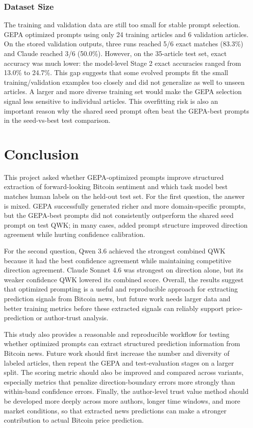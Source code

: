 \documentclass[sigconf,screen]{acmart}
\begin{document}
\subsubsection{Dataset Size}

The training and validation data are still too small for stable prompt
selection. GEPA optimized prompts using only 24 training articles and 6
validation articles. On the stored validation outputs, three runs reached
5/6 exact matches (83.3\%) and Claude reached 3/6 (50.0\%). However, on the
35-article test set, exact accuracy was much lower: the model-level Stage 2
exact accuracies ranged from 13.0\% to 24.7\%. This gap suggests that some
evolved prompts fit the small training/validation examples too closely and did
not generalize as well to unseen articles. A larger and more diverse training
set would make the GEPA selection signal less sensitive to individual articles.
This overfitting risk is also an important reason why the shared seed prompt
often beat the GEPA-best prompts in the seed-vs-best test comparison.

\section{Conclusion}

This project asked whether GEPA-optimized prompts improve structured
extraction of forward-looking Bitcoin sentiment and which task model best
matches human labels on the held-out test set. For the first question, the
answer is mixed. GEPA successfully generated richer and more domain-specific
prompts, but the GEPA-best prompts did not consistently outperform the shared
seed prompt on test QWK; in many cases, added prompt structure improved
direction agreement while hurting confidence calibration.

For the second question, Qwen 3.6 achieved the strongest combined QWK because
it had the best confidence agreement while maintaining competitive direction
agreement. Claude Sonnet 4.6 was strongest on direction alone, but its weaker
confidence QWK lowered its combined score. Overall, the results suggest that
optimized prompting is a useful and reproducible approach for extracting
prediction signals from Bitcoin news, but future work needs larger data and
better training metrics before these extracted signals can reliably support
price-prediction or author-trust analysis.

This study also provides a reasonable and reproducible workflow for testing
whether optimized prompts can extract structured prediction information from
Bitcoin news. Future work should first increase the number and diversity of
labeled articles, then repeat the GEPA and test-evaluation stages on a larger
split. The scoring metric should also be improved and compared across variants,
especially metrics that penalize direction-boundary errors more strongly than
within-band confidence errors. Finally, the author-level trust value method
should be developed more deeply across more authors, longer time windows, and
more market conditions, so that extracted news predictions can make a stronger
contribution to actual Bitcoin price prediction.
\end{document}
